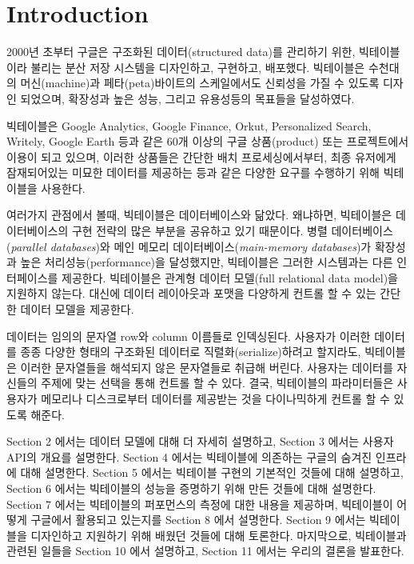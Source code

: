 \documentclass[twocolumn]{article}
\begin{document}
\section{Introduction}

2000년 초부터 구글은 구조화된 데이터(structured data)를 관리하기 위한, 빅테이블이라 불리는 분산 저장 시스템을 디자인하고, 구현하고, 배포했다.
빅테이블은 수천대의 머신(machine)과 페타(peta)바이트의 스케일에서도 신뢰성을 가질 수 있도록 디자인 되었으며, 확장성과 높은 성능, 그리고 유용성등의 목표들을 달성하였다.

빅테이블은 Google Analytics, Google Finance, Orkut, Personalized Search, Writely, Google Earth 등과 같은 60개 이상의 구글 상품(product) 또는 프로젝트에서 이용이 되고 있으며, 이러한 상품들은 간단한 배치 프로세싱에서부터, 최종 유저에게 잠재되어있는 미묘한 데이터를 제공하는 등과 같은 다양한 요구를 수행하기 위해 빅테이블을 사용한다.
 
 여러가지 관점에서 볼때,  빅테이블은 데이터베이스와 닮았다. 왜냐하면, 빅테이블은 데이터베이스의 구현 전략의 많은 부분을 공유하고 있기 때문이다.
 병렬 데이터베이스(\textit{parallel databases})와 메인 메모리 데이터베이스(\textit{main-memory databases})가 확장성과 높은 처리성능(performance)을 달성했지만, 빅테이블은 그러한 시스템과는 다른 인터페이스를 제공한다. 빅테이블은 관계형 데이터 모델(full relational data model)을 지원하지 않는다. 대신에 데이터 레이아웃과 포맷을 다양하게 컨트롤 할 수 있는 간단한 데이터 모델을 제공한다.

데이터는 임의의 문자열 row와 column 이름들로 인덱싱된다. 사용자가 이러한 데이터를 종종 다양한 형태의 구조화된 데이터로 직렬화(serialize)하려고 할지라도, 빅테이블은 이러한 문자열들을 해석되지 않은 문자열들로 취급해 버린다. 사용자는 데이터를 자신들의 주제에 맞는 선택을 통해 컨트롤 할 수 있다. 결국, 빅테이블의 파라미터들은 사용자가 메모리나 디스크로부터 데이터를 제공받는 것을 다이나믹하게 컨트롤 할 수 있도록 해준다.
 
 Section 2 에서는 데이터 모델에 대해 더 자세히 설명하고, Section 3 에서는 사용자 API의 개요를 설명한다. Section 4 에서는 빅테이블에 의존하는 구글의 숨겨진 인프라에 대해 설명한다. Section 5 에서는 빅테이블 구현의 기본적인 것들에 대해 설명하고, Section 6 에서는 빅테이블의 성능을 증명하기 위해 만든 것들에 대해 설명한다. Section 7 에서는 빅테이블의 퍼포먼스의 측정에 대한 내용을 제공하며, 빅테이블이 어떻게 구글에서 활용되고 있는지를 Section 8 에서 설명한다. Section 9 에서는 빅테이블을 디자인하고 지원하기 위해 배웠던 것들에 대해 토론한다. 마지막으로, 빅테이블과 관련된 일들을 Section 10 에서 설명하고, Section 11 에서는 우리의 결론을 발표한다.
\end{document}
